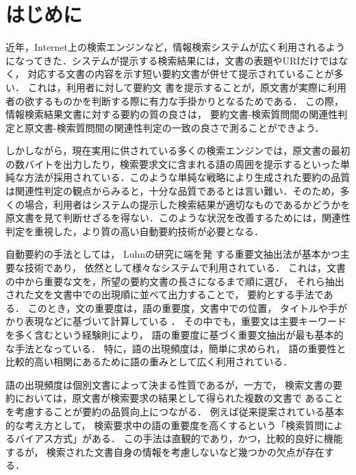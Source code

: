 \maketitle


\section{はじめに}

近年，Internet上の検索エンジンなど，情報検索システムが広く利用されるよう
になってきた．システムが提示する検索結果には，文書の表題やURIだけではなく，
対応する文書の内容を示す短い要約文書が併せて提示されていることが多い．
これは，利用者に対して要約文
書を提示することが，原文書が実際に利用者の欲するものかを判断する際に有力な手掛かりとなるためである．
この際，情報検索結果文書に対する要約の質の良さは，
要約文書-検索質問間の関連性判定と原文書-検索質問間の関連性判定の一致の良さで測ることができよう．

しかしながら，現在実用に供されている多くの検索エンジンでは，原文書の最初
の数バイトを出力したり，検索要求文に含まれる語の周囲を提示するといった単
純な方法が採用されている．このような単純な戦略により生成された要約の品質
は関連性判定の観点からみると，十分な品質であるとは言い難い．そのため，多
くの場合，利用者はシステムの提示した検索結果が適切なものであるかどうかを
原文書を見て判断せざるを得ない．このような状況を改善するためには，関連性
判定を重視した，より質の高い自動要約技術が必要となる．

自動要約の手法としては，
Luhn\cite{Luhn:TheAutomaticCreationOfLiteratureAbstracts}の研究に端を発
する重要文抽出法が基本かつ主要な技術であり，
依然として様々なシステムで利用されている．
これは，文書の中から重要な文を，所望の要約文書の長さになるまで順に選び，
それら抽出された文を文書中での出現順に並べて出力することで，
要約とする手法である．
このとき，文の重要度は，語の重要度，文書中での位置，
タイトルや手がかり表現などに基づいて計算している
\cite{奥村:テキスト自動要約に関する研究動向,奥村:テキスト自動要約に関する最近の話題}．
その中でも，重要文は主要キーワードを多く含むという経験則により，
語の重要度に基づく重要文抽出が最も基本的な手法となっている．
特に，語の出現頻度は，簡単に求められ，
語の重要性と比較的高い相関にあるために語の重みとして広く利用されている．

語の出現頻度は個別文書によって決まる性質であるが，一方で，
検索文書の要約においては，原文書が検索要求の結果として得られた複数の文書で
あることを考慮することが要約の品質向上につながる．
例えば従来提案されている基本的な考え方として，
検索要求中の語の重要度を高くするという「検索質問によるバイアス方式」がある\cite{Tombros:AdvantagesOfQueryBiasedSummariesInInformationRetrieval}．
この手法は直観的であり，かつ，比較的良好に機能するが，
検索された文書自身の情報を考慮しないなど幾つかの欠点が存在する．

